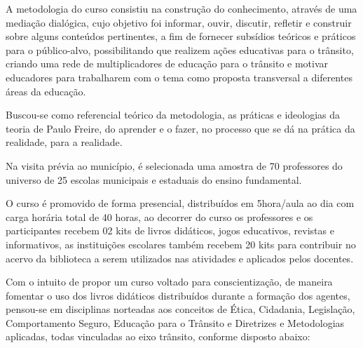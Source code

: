\documentclass[output=paper,colorlinks,citecolor=brown]{langscibook}
\begin{document}
A metodologia do curso consistiu na construção do conhecimento, através de uma mediação dialógica, cujo objetivo foi informar, ouvir, discutir, refletir e construir sobre alguns conteúdos pertinentes, a fim de fornecer subsídios teóricos e práticos para o público-alvo, possibilitando que realizem ações educativas para o trânsito, criando uma rede de multiplicadores de educação para o trânsito e motivar educadores para trabalharem com o tema como proposta transversal a diferentes áreas da educação. \vskip0.3cm

Buscou-se como referencial teórico da metodologia, as práticas e ideologias da teoria de Paulo Freire, do aprender e o fazer, no processo que se dá na prática da realidade, para a realidade.\vskip0.3cm

Na visita prévia ao município, é selecionada uma amostra de 70 professores do universo de 25 escolas municipais e estaduais do ensino fundamental.  \vskip0.3cm

O curso é promovido de forma presencial, distribuídos em 5hora/aula ao dia com carga horária total de 40 horas, ao decorrer do curso os professores e os participantes recebem 02 kits de livros didáticos, jogos educativos, revistas e informativos, as instituições escolares também recebem 20 kits para contribuir no acervo da biblioteca a serem utilizados nas atividades e aplicados pelos docentes.\vskip0.3cm

Com o intuito de propor um curso voltado para conscientização, de maneira fomentar o uso dos livros didáticos distribuídos durante a formação dos agentes, pensou-se em disciplinas norteadas aos conceitos de Ética, Cidadania, Legislação, Comportamento Seguro, Educação para o Trânsito e Diretrizes e Metodologias aplicadas, todas vinculadas ao eixo trânsito, conforme disposto abaixo:


















{\sloppy\printbibliography[heading=subbibliography,notkeyword=this]}
\end{document}
